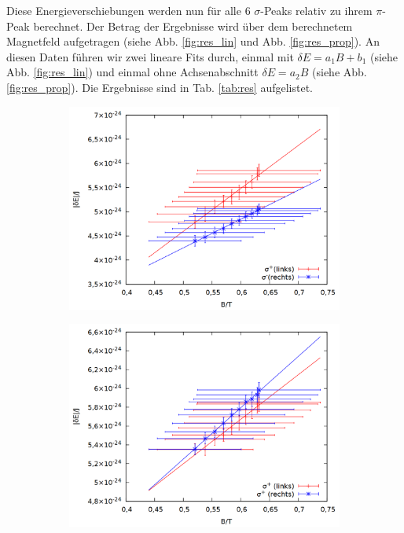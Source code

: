 Diese Energieverschiebungen werden nun für alle 6 $\sigma$-Peaks relativ zu ihrem $\pi$-Peak berechnet. Der Betrag der Ergebnisse wird über dem berechnetem Magnetfeld aufgetragen (siehe Abb. \ref{fig:res_lin} und Abb. \ref{fig:res_prop}). An diesen Daten führen wir zwei lineare Fits durch, einmal mit $\delta E = a_1 B + b_1$ (siehe Abb. \ref{fig:res_lin}) und einmal ohne Achsenabschnitt $\delta E = a_2 B$ (siehe Abb. \ref{fig:res_prop}). Die Ergebnisse sind in Tab. \ref{tab:res} aufgelistet.\\
\begin{figure}
\centering
\begin{subfigure}{0.6\textwidth}
\includegraphics[width=\textwidth]{data/zeeman/out_zeeman_neu_links.png}
\end{subfigure}
\begin{subfigure}{0.6\textwidth}
\includegraphics[width=\textwidth]{data/zeeman/out_zeeman_neu_mitte.png}

\end{subfigure}
\end{figure}
